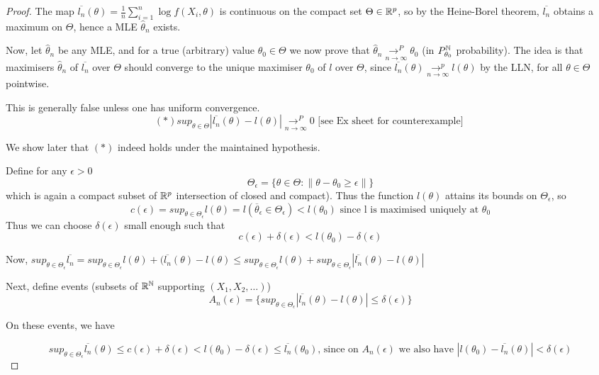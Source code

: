 \documentclass[a4paper]{article}
\begin{document}
\begin{proof}
	The map $\overline{l_{n}}(\theta) = \frac{1}{n} \sum_{i=1}^{n} \log f(X_i, \theta)$ is continuous on the compact set $\Theta \in \mathbb{R}^{p}$, so by the Heine-Borel theorem, $\overline{l_n}$ obtains a maximum on $\Theta$, hence a MLE  $\hat{\theta}_n $ exists.

	Now, let  $\hat{\theta}_n$ be any MLE, and for a true (arbitrary) value $\theta_0 \in \Theta$ we now prove that $\hat{\theta}_n \underset{n\to \infty}{\to ^{P}} \theta_0$ (in $P_{\theta_0}^{\mathbb{N}}$ probability). The idea is that maximisers $\hat{\theta}_n$ of $\overline{l_n}$ over $\Theta$ should converge to the unique maximiser  $\theta_0$ of $l$ over $\Theta$, since  $\overline{l_n}(\theta) \underset{n\to \infty}{\to ^{p}} l(\theta)$ by the LLN, for all $\theta \in  \Theta$ pointwise.

	This is generally false unless one has uniform convergence.
	\[
		(\ast) sup_{\theta \in \Theta} |\overline{l_n}(\theta) - l(\theta)| \underset{n\to \infty}{\to ^{P}} 0 \text{ [see Ex sheet for counterexample] }
	\] 

	We show later that $(\ast)$ indeed holds under the maintained hypothesis.

	Define for any $\epsilon > 0$ 
	\[
		\Theta_{\epsilon} = \{\theta \in  \Theta : \|\theta - \theta_0 \ge \epsilon\|\} 
	\] 
	which is again a compact subset of $\mathbb{R}^{p}$ intersection of closed and compact). Thus the function $l(\theta)$ attains its bounds on  $\Theta_{\epsilon}$, so
	\[
		c(\epsilon) = sup_{\theta \in \Theta_{\epsilon}} l(\theta) = l(\overline{\theta}_{\epsilon} \in \Theta_{\epsilon}) < l(\theta_0) \text{ since l is maximised uniquely at } \theta_0
	\] 
	Thus we can choose $\delta(\epsilon)$ small enough such that 
	 \[
	 c(\epsilon) + \delta(\epsilon) < l(\theta_0) - \delta(\epsilon) \tag{\dag}
	\]

	Now, $sup_{\theta \in  \Theta_{\epsilon}} \overline{l_n} = sup_{\theta \in \Theta_{\epsilon}} l(\theta) + (\overline{l_n}(\theta) - l(\theta) \le sup_{\theta \in \Theta_{\epsilon}} l(\theta) + sup_{\theta \in \Theta_{\epsilon}} |\overline{l_n} (\theta) - l(\theta)|$

	Next, define events (subsets of $\mathbb{R}^{\mathbb{N}}$ supporting $(X_1, X_2,\ldots)$) 
	\[
		A_n(\epsilon) = \{sup_{\theta \in \Theta_{\epsilon}} |\overline{l_n}(\theta) - l(\theta) | \le  \delta(\epsilon)\} 
	\] 

	On these events, we have 

	\[
		sup_{\theta \in \Theta_{\epsilon}} \overline{l_n} (\theta) \le  c(\epsilon) + \delta(\epsilon) < l(\theta_0) - \delta(\epsilon) \le \overline{l_n}(\theta_{0}) \text{, since on $A_n(\epsilon)$ we also have } |l(\theta_0) - \overline{l_n}(\theta)| < \delta(\epsilon)
	\] 


\end{proof}
\end{document}

